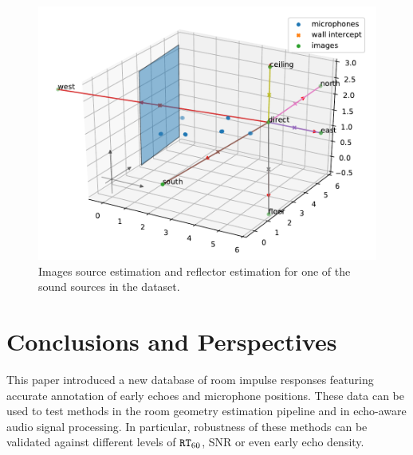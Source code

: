 \begin{figure}

        \includegraphics[width=\linewidth]{figures/dechorate/estimated_reflector}

    \caption{Images source estimation and reflector estimation for one of the sound sources in the dataset.}
    \label{fig:wall_rec}
\end{figure}

\section{Conclusions and Perspectives}

This paper introduced a new database of room impulse responses featuring accurate annotation of early echoes and microphone positions. These data can be used to test methods in the room geometry estimation pipeline and in echo-aware audio signal processing. In particular, robustness of these methods can be validated against different levels of $\mathtt{RT}_{60}$, SNR or even early echo density.